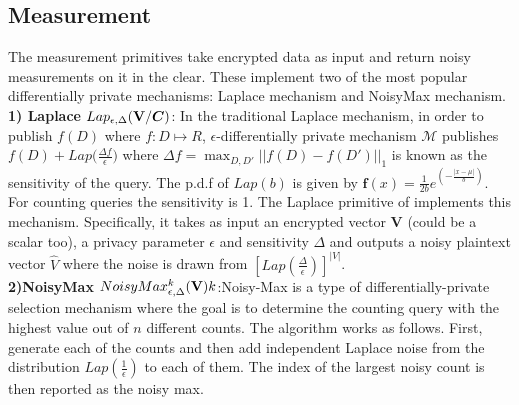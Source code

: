 \subsection{Measurement} \label{sec:measurement_primitives}
The measurement primitives take encrypted data as input and return noisy measurements on it in the clear. These implement two of the most popular differentially private mechanisms: Laplace mechanism  and NoisyMax mechanism. 
\\\textbf{1) \textsf{Laplace }}$Lap_{\epsilon,\Delta}(\mathbf{V}/\boldsymbol{C})$:  %
In the traditional Laplace mechanism, in order
to publish $f(D)$ where $f : D \mapsto R$, $\epsilon$-differentially private mechanism $\mathcal{M}$ 
publishes $f(D) + Lap\Big(\frac{\Delta f}{\epsilon}\Big)$  
where $\Delta f = \max_{D,D'}||f(D)-f(D')||_1$ is known as the sensitivity of the query. The p.d.f of $Lap(b)$ is given by $\mathbf{f}(x)={\frac  {1}{2b}}e^{ \left(-{\frac  {|x-\mu |}{b}}\right)}$. %
For counting queries the sensitivity is 1. The \textsf{Laplace} primitive of \system implements this mechanism. Specifically, it takes as input an encrypted vector $\mathbf{V}$ (could be a scalar too), a privacy parameter $\epsilon$ and sensitivity $\Delta$ and  outputs a noisy plaintext vector $\hat{V}$ where the noise is drawn from $[Lap(\frac{\Delta}{\epsilon})]^{|V|}$.\\
 \textbf{2)\textsf{NoisyMax }}$NoisyMax_{\epsilon,\Delta}^k(\mathbf{V})k$:Noisy-Max is a type of differentially-private selection mechanism \cite{Dork} where the goal is to determine the counting query with the highest value out of $n$ different counts.  
	The algorithm works as follows. First, generate each of the counts and then add independent Laplace noise from the distribution $Lap(\frac{1}{\epsilon})$ to each of them. The index of the largest noisy count is then reported as the noisy max.
